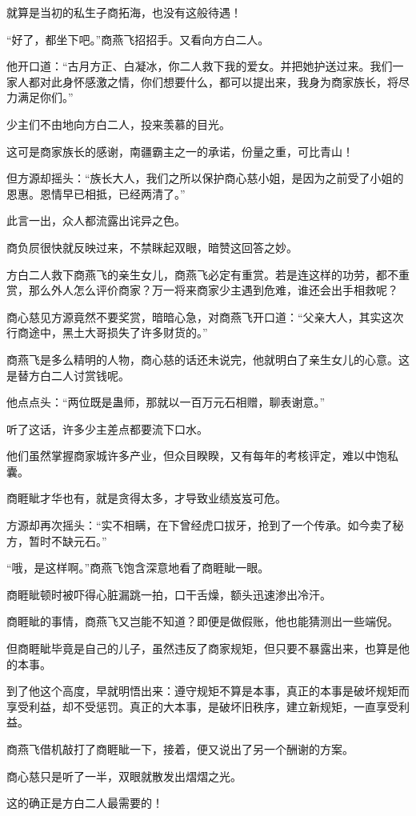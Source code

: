 \begin{this_body}
就算是当初的私生子商拓海，也没有这般待遇！

“好了，都坐下吧。”商燕飞招招手。又看向方白二人。

他开口道：“古月方正、白凝冰，你二人救下我的爱女。并把她护送过来。我们一家人都对此身怀感激之情，你们想要什么，都可以提出来，我身为商家族长，将尽力满足你们。”

少主们不由地向方白二人，投来羡慕的目光。

这可是商家族长的感谢，南疆霸主之一的承诺，份量之重，可比青山！

但方源却摇头：“族长大人，我们之所以保护商心慈小姐，是因为之前受了小姐的恩惠。恩情早已相抵，已经两清了。”

此言一出，众人都流露出诧异之色。

商负屃很快就反映过来，不禁眯起双眼，暗赞这回答之妙。

方白二人救下商燕飞的亲生女儿，商燕飞必定有重赏。若是连这样的功劳，都不重赏，那么外人怎么评价商家？万一将来商家少主遇到危难，谁还会出手相救呢？

商心慈见方源竟然不要奖赏，暗暗心急，对商燕飞开口道：“父亲大人，其实这次行商途中，黑土大哥损失了许多财货的。”

商燕飞是多么精明的人物，商心慈的话还未说完，他就明白了亲生女儿的心意。这是替方白二人讨赏钱呢。

他点点头：“两位既是蛊师，那就以一百万元石相赠，聊表谢意。”

听了这话，许多少主差点都要流下口水。

他们虽然掌握商家城许多产业，但众目睽睽，又有每年的考核评定，难以中饱私囊。

商睚眦才华也有，就是贪得太多，才导致业绩岌岌可危。

方源却再次摇头：“实不相瞒，在下曾经虎口拔牙，抢到了一个传承。如今卖了秘方，暂时不缺元石。”

“哦，是这样啊。”商燕飞饱含深意地看了商睚眦一眼。

商睚眦顿时被吓得心脏漏跳一拍，口干舌燥，额头迅速渗出冷汗。

商睚眦的事情，商燕飞又岂能不知道？即便是做假账，他也能猜测出一些端倪。

但商睚眦毕竟是自己的儿子，虽然违反了商家规矩，但只要不暴露出来，也算是他的本事。

到了他这个高度，早就明悟出来：遵守规矩不算是本事，真正的本事是破坏规矩而享受利益，却不受惩罚。真正的大本事，是破坏旧秩序，建立新规矩，一直享受利益。

商燕飞借机敲打了商睚眦一下，接着，便又说出了另一个酬谢的方案。

商心慈只是听了一半，双眼就散发出熠熠之光。

这的确正是方白二人最需要的！

\end{this_body}

